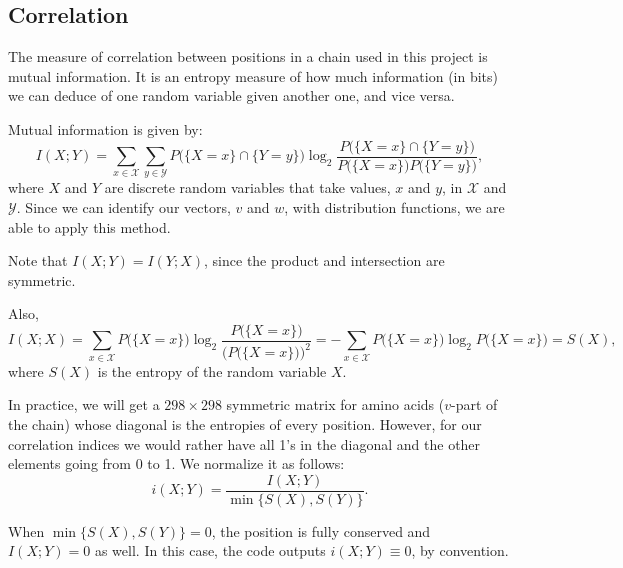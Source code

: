\subsection{Correlation}
The measure of correlation between positions in a chain used in this project is mutual information. It is an entropy measure of how much information (in bits) we can deduce of one random variable given another one, and vice versa.

Mutual information is given by:
$$
I(X;Y) = \sum_{x\in\mathcal X}\sum_{y\in\mathcal Y}
P\big(\{X=x\}\cap \{Y=y\}\big)\log_2\frac{P\big(\{X=x\}\cap \{Y=y\}\big)}{P\big(\{X=x\}\big)P\big(\{Y=y\}\big)},
$$
where $X$ and $Y$ are discrete random variables that take values, $x$ and $y$, in $\mathcal X$ and $\mathcal Y$. Since we can identify our vectors, $v$ and $w$, with distribution functions, we are able to apply this method.

Note that $I(X;Y)=I(Y;X)$, since the product and intersection are symmetric.

Also, 
$$I(X;X)=\sum_{x\in\mathcal X}P\big(\{X=x\}\big)\log_2 \frac{P\big(\{X=x\}\big)}{\big(
P\big(\{X=x\}\big)\big)^2}=-\sum_{x\in\mathcal X}P\big(\{X=x\}\big)\log_2P\big(\{X=x\}\big)=S(X),$$
where $S(X)$ is the entropy of the random variable $X$.

In practice, we will get a $298\times298$ symmetric matrix for amino acids ($v$-part of the chain) whose diagonal is the entropies of every position. However, for our correlation indices we would rather have all 1's in the diagonal and the other elements going from 0 to 1. We normalize it as follows:
$$
i(X;Y) = \frac{I(X;Y)}{\min\{S(X),S(Y)\}}.
$$

When $\min\{S(X), S(Y)\} = 0$, the position is fully conserved and $I(X;Y)=0$ as well. In this case, the code outputs $i(X;Y) \equiv 0$, by convention.